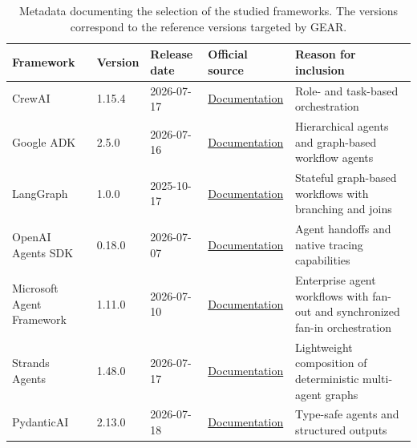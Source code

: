 \begin{table}[t]
    \centering
    \caption{Metadata documenting the selection of the studied frameworks.
    The versions correspond to the reference versions targeted by GEAR.}
    \label{tab:framework-metadata}
    \small
    \begin{tabular}{
        @{}
        p{}
        p{}
        p{}
        p{}
        p{}
        @{}
    }
        \toprule
        \textbf{Framework}
        & \textbf{Version}
        & \textbf{Release date}
        & \textbf{Official source}
        & \textbf{Reason for inclusion} \\
        \midrule

        CrewAI
        & 1.15.4
        & 2026-07-17
        & \href{https://docs.crewai.com/}{Documentation}
        & Role- and task-based orchestration \\

        Google ADK
        & 2.5.0
        & 2026-07-16
        & \href{https://adk.dev/}{Documentation}
        & Hierarchical agents and graph-based workflow agents \\

        LangGraph
        & 1.0.0
        & 2025-10-17
        & \href{https://docs.langchain.com/oss/python/langgraph/overview}
        {Documentation}
        & Stateful graph-based workflows with branching and joins \\

        OpenAI Agents SDK
        & 0.18.0
        & 2026-07-07
        & \href{https://openai.github.io/openai-agents-python/}
        {Documentation}
        & Agent handoffs and native tracing capabilities \\

        Microsoft Agent Framework
        & 1.11.0
        & 2026-07-10
        & \href{https://learn.microsoft.com/en-us/agent-framework/}
        {Documentation}
        & Enterprise agent workflows with fan-out and synchronized fan-in
        orchestration \\

        Strands Agents
        & 1.48.0
        & 2026-07-17
        & \href{https://strandsagents.com/docs/}
        {Documentation}
        & Lightweight composition of deterministic multi-agent graphs \\

        PydanticAI
        & 2.13.0
        & 2026-07-18
        & \href{https://pydantic.dev/docs/ai/overview/}
        {Documentation}
        & Type-safe agents and structured outputs \\


\end{tabular}
\end{table}
